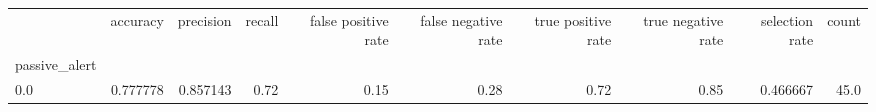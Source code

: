 \begin{tabular}{lrrrrrrrrr}
\toprule
{} &  accuracy &  precision &  recall &  false positive rate &  false negative rate &  true positive rate &  true negative rate &  selection rate &  count \\
passive\_alert &           &            &         &                      &                      &                     &                     &                 &        \\
\midrule
0.0           &  0.777778 &   0.857143 &    0.72 &                 0.15 &                 0.28 &                0.72 &                0.85 &        0.466667 &   45.0 \\
\bottomrule
\end{tabular}
